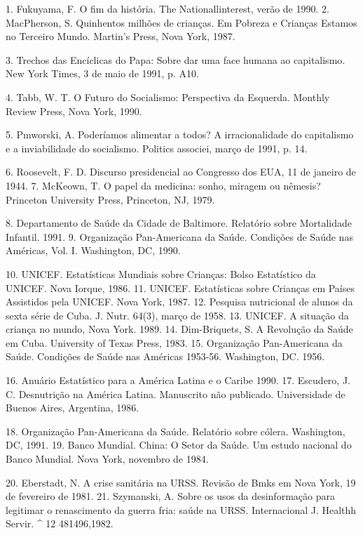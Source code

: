 \documentclass[twocolumn,amsmath,amssymb,aps,pre,floatfix]{revtex4-2}
\begin{document}
\par
1. Fukuyama, F. O fim da história. The Nationallinterest, verão de 1990. 2. MacPherson, S. Quinhentos milhões de crianças. Em Pobreza e Crianças Estamos no Terceiro Mundo. Martin's Press, Nova York, 1987.
\par
3. Trechos das Encíclicas do Papa: Sobre dar uma face humana ao capitalismo. New York Times, 3 de maio de 1991, p. A10.
\par
4. Tabb, W. T. O Futuro do Socialismo: Perspectiva da Esquerda. Monthly Review Press, Nova York, 1990.
\par
5. Pmworski, A. Poderíamos alimentar a todos? A irracionalidade do capitalismo e a inviabilidade do socialismo. Politics associei, março de 1991, p. 14.
\par
6. Roosevelt, F. D. Discurso presidencial ao Congresso dos EUA, 11 de janeiro de 1944. 7. McKeown, T. O papel da medicina: sonho, miragem ou nêmesis? Princeton University Press, Princeton, NJ, 1979.
\par
8. Departamento de Saúde da Cidade de Baltimore. Relatório sobre Mortalidade Infantil. 1991. 9. Organização Pan-Americana da Saúde. Condições de Saúde nas Américas, Vol. I. Washington, DC, 1990.
\par
10. UNICEF. Estatísticas Mundiais sobre Crianças: Bolso Estatístico da UNICEF. Nova Iorque, 1986. 11. UNICEF. Estatísticas sobre Crianças em Países Assistidos pela UNICEF. Nova York, 1987. 12. Pesquisa nutricional de alunos da sexta série de Cuba. J. Nutr. 64(3), março de 1958. 13. UNICEF. A situação da criança no mundo, Nova York. 1989. 14. Dim-Briquets, S. A Revolução da Saúde em Cuba. University of Texas Press, 1983. 15. Organização Pan-Americana da Saúde. Condições de Saúde nas Américas 1953-56. Washington, DC. 1956.
\par
16. Anuário Estatístico para a América Latina e o Caribe 1990. 17. Escudero, J. C. Desnutrição na América Latina. Manuscrito não publicado. Universidade de Buenos Aires, Argentina, 1986.
\par
18. Organização Pan-Americana da Saúde. Relatório sobre cólera. Washington, DC, 1991. 19. Banco Mundial. China: O Setor da Saúde. Um estudo nacional do Banco Mundial. Nova York, novembro de 1984.
\par
20. Eberstadt, N. A crise sanitária na URSS. Revisão de Bmks em Nova York, 19 de fevereiro de 1981. 21. Szymanski, A. Sobre os usos da desinformação para legitimar o renascimento da guerra fria: saúde na URSS. Internacional J. Healthh Servir. ^ 12 481496,1982.
\par
\end{document}
